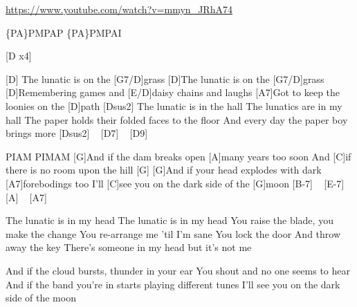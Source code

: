 \url{https://www.youtube.com/watch?v=mmyn_JRhA74}

\begin{guitar}
\{PA\}PMPAP \{PA\}PMPAI

[D x4] 


[D]
The lunatic is on the [G7/D]grass
[D]The lunatic is on the [G7/D]grass
[D]Remembering games and [E/D]daisy chains and laughs
[A7]Got to keep the loonies on the [D]path [Dsus2]
The lunatic is in the hall
The lunatics are in my hall
The paper holds their folded faces to the floor
And every day the paper boy brings more [Dsus2] ~ [D7] ~ [D9]

PIAM PIMAM
[G]And if the dam breaks open [A]many years too soon
And [C]if there is no room upon the hill [G]
[G]And if your head explodes with dark [A7]forebodings too
I'll [C]see you on the dark side of the [G]moon [B-7] ~ [E-7] ~ [A] ~ [A7]

The lunatic is in my head
The lunatic is in my head
You raise the blade, you make the change
You re-arrange me 'til I'm sane
You lock the door
And throw away the key
There's someone in my head but it's not me

And if the cloud bursts, thunder in your ear
You shout and no one seems to hear
And if the band you're in starts playing different tunes
I'll see you on the dark side of the moon
\end{guitar}
